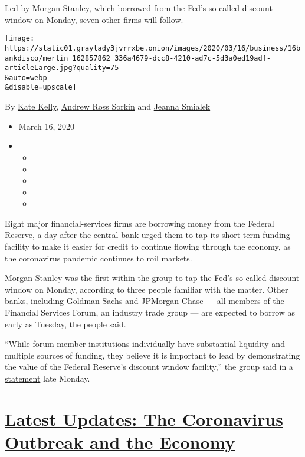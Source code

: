 Led by Morgan Stanley, which borrowed from the Fed's so-called discount
window on Monday, seven other firms will follow.

\texttt{[image: https://static01.graylady3jvrrxbe.onion/images/2020/03/16/business/16bankdisco/merlin\_162857862\_336a4679-dcc8-4210-ad7c-5d3a0ed19adf-articleLarge.jpg?quality=75\\\&auto=webp\\\&disable=upscale]}

By \href{https://www.nytimes3xbfgragh.onion/by/kate-kelly}{Kate Kelly},
\href{https://www.nytimes3xbfgragh.onion/by/andrew-ross-sorkin}{Andrew
Ross Sorkin} and
\href{https://www.nytimes3xbfgragh.onion/by/jeanna-smialek}{Jeanna
Smialek}

\begin{itemize}
\item
  March 16, 2020
\item
  \begin{itemize}
  \item
  \item
  \item
  \item
  \item
  \end{itemize}
\end{itemize}

Eight major financial-services firms are borrowing money from the
Federal Reserve, a day after the central bank urged them to tap its
short-term funding facility to make it easier for credit to continue
flowing through the economy, as the coronavirus pandemic continues to
roil markets.

Morgan Stanley was the first within the group to tap the Fed's so-called
discount window on Monday, according to three people familiar with the
matter. Other banks, including Goldman Sachs and JPMorgan Chase --- all
members of the Financial Services Forum, an industry trade group --- are
expected to borrow as early as Tuesday, the people said.

``While forum member institutions individually have substantial
liquidity and multiple sources of funding, they believe it is important
to lead by demonstrating the value of the Federal Reserve's discount
window facility,'' the group said in a
\href{https://www.fsforum.com/types/press/releases/financial-services-forum-statement-on-the-discount-window/}{statement}
late Monday.

\hypertarget{latest-updates-the-coronavirus-outbreak-and-the-economy}{%
\section{\texorpdfstring{\href{https://www.nytimes3xbfgragh.onion/live/2020/09/11/business/stock-market-today-coronavirus?action=click\&pgtype=Article\&state=default\&region=MAIN_CONTENT_1\&context=storylines_live_updates}{Latest
Updates: The Coronavirus Outbreak and the
Economy}}{Latest Updates: The Coronavirus Outbreak and the Economy}}\label{latest-updates-the-coronavirus-outbreak-and-the-economy}}

